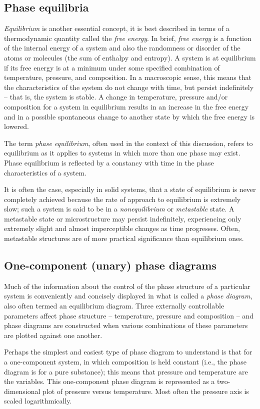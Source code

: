 \subsection{Phase equilibria}
\textit{Equilibrium} is another essential concept, it is best described in terms of a thermodynamic quantity called the \textit{free energy}. In brief, \textit{free energy} is a function of the internal energy of a system and also the randomness or disorder of the atoms or molecules (the sum of enthalpy and entropy). A system is at equilibrium if its free energy is at a minimum under some specified combination of temperature, pressure, and composition. In a macroscopic sense, this means that the characteristics of the system do not change with time, but persist indefinitely -- that is, the system is stable. A change in temperature, pressure and/or composition for a system in equilibrium results in an increase in the free energy and in a possible spontaneous change to another state by which the free energy is lowered.

The term \textit{phase equilibrium}, often used in the context of this discussion, refers to equilibrium as it applies to systems in which more than one phase may exist. Phase equilibrium is reflected by a constancy with time in the phase characteristics of a system.

It is often the case, especially in solid systems, that a state of equilibrium is never completely achieved because the rate of approach to equilibrium is extremely slow; such a system is said to be in a \textit{nonequilibrium} or \textit{metastable} state. A metastable state or microstructure may persist indefinitely, experiencing only extremely slight and almost imperceptible changes as time progresses. Often, metastable structures are of more practical significance than equilibrium ones. 

\subsection{One-component (unary) phase diagrams}
Much of the information about the control of the phase structure of a particular system is conveniently and concisely displayed in what is called a \textit{phase diagram}, also often termed an equilibrium diagram. Three externally controllable parameters affect phase structure -- temperature, pressure and composition -- and phase diagrams are constructed when various combinations of these parameters are plotted against one another. 

Perhaps the simplest and easiest type of phase diagram to understand is that for a one-component system, in which composition is held constant (i.e., the phase diagram is for a pure substance); this means that pressure and temperature are the variables. This one-component phase diagram is represented as a two-dimensional plot of pressure versus temperature. Most often the pressure axis is scaled logarithmically.

